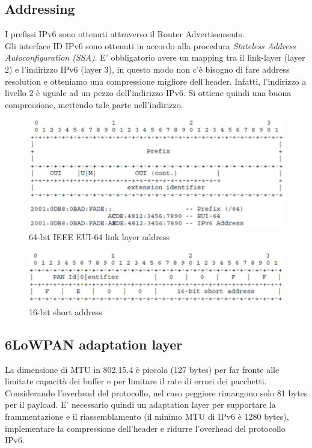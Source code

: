 \documentclass{article}
\begin{document}
\subsection{Addressing}
I prefissi IPv6 sono ottenuti attraverso il Router Advertisements. \\ Gli interface ID IPv6 sono ottenuti in accordo alla procedura \textit{Stateless Address Autoconfiguration (SSA)}. E' obbligatorio avere un mapping tra il link-layer (layer 2) e l'indirizzo IPv6 (layer 3), in questo modo non c'è bisogno di fare address resolution e otteniamo una compressione migliore dell'header. Infatti, l'indirizzo a livello 2 è uguale ad un pezzo dell'indirizzo IPv6. Si ottiene quindi una buona compressione, mettendo tale parte nell'indirizzo.
\begin{figure}[H]
\centering
\includegraphics[scale=0.6]{figures/64bit link layer address.png}
\caption{64-bit IEEE EUI-64 link layer address}
\end{figure}
\begin{figure}[H]
\centering
\includegraphics[scale=0.6]{figures/16bit short address.png}
\caption{16-bit short address}
\end{figure}

\subsection{6LoWPAN adaptation layer}
La dimensione di MTU in 802.15.4 è piccola (127 bytes) per far fronte alle limitate capacità dei buffer e per limitare il rate di errori dei pacchetti. \\ Considerando l'overhead del protocollo, nel caso peggiore rimangono solo 81 bytes per il payload. E' necessario quindi un adaptation layer per supportare la frammentazione e il riassemblamento (il minimo MTU di IPv6 è 1280 bytes), implementare la compressione dell'header e ridurre l'overhead del protocollo IPv6. 
\end{document}

